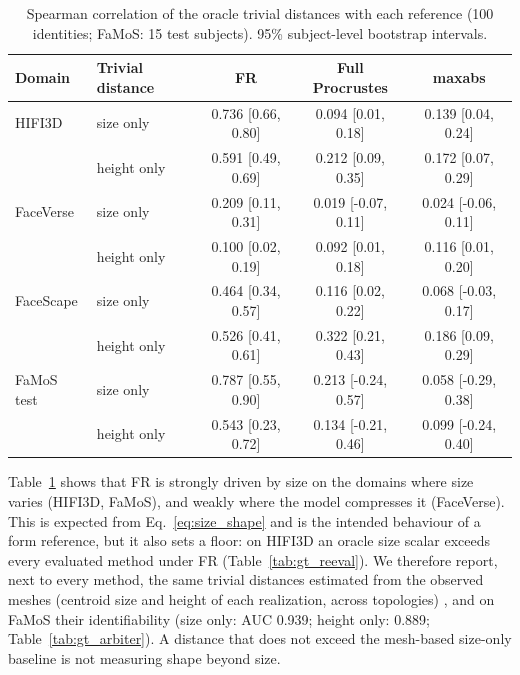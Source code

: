\begin{table}[!ht]
\centering
\small
\caption{Spearman correlation of the oracle trivial distances with each
reference (100 identities; FaMoS: 15 test subjects). 95\% subject-level
bootstrap intervals.}
\label{tab:trivial}
\begin{tabular}{llccc}
\toprule
Domain & Trivial distance & FR & Full Procrustes & maxabs \\
\midrule
HIFI3D     & size only   & 0.736 [0.66, 0.80] & 0.094 [0.01, 0.18]  & 0.139 [0.04, 0.24] \\
           & height only & 0.591 [0.49, 0.69] & 0.212 [0.09, 0.35]  & 0.172 [0.07, 0.29] \\
FaceVerse  & size only   & 0.209 [0.11, 0.31] & 0.019 [-0.07, 0.11] & 0.024 [-0.06, 0.11] \\
           & height only & 0.100 [0.02, 0.19] & 0.092 [0.01, 0.18]  & 0.116 [0.01, 0.20] \\
FaceScape  & size only   & 0.464 [0.34, 0.57] & 0.116 [0.02, 0.22]  & 0.068 [-0.03, 0.17] \\
           & height only & 0.526 [0.41, 0.61] & 0.322 [0.21, 0.43]  & 0.186 [0.09, 0.29] \\
FaMoS test & size only   & 0.787 [0.55, 0.90] & 0.213 [-0.24, 0.57] & 0.058 [-0.29, 0.38] \\
           & height only & 0.543 [0.23, 0.72] & 0.134 [-0.21, 0.46] & 0.099 [-0.24, 0.40] \\
\bottomrule
\end{tabular}
\end{table}

Table~\ref{tab:trivial} shows that FR is strongly driven by size on the
domains where size varies (HIFI3D, FaMoS), and weakly where the model
compresses it (FaceVerse). This is expected from Eq.~\eqref{eq:size_shape}
and is the intended behaviour of a form reference, but it also sets a floor:
on HIFI3D an oracle size scalar exceeds every evaluated method under FR
(Table~\ref{tab:gt_reeval}). We therefore report, next to every method, the
same trivial distances estimated from the observed meshes (centroid size and
height of each realization, across topologies)
,
and on FaMoS their identifiability (size only: AUC 0.939; height only: 0.889;
Table~\ref{tab:gt_arbiter}).
A distance that does not exceed the mesh-based size-only baseline is not
measuring shape beyond size.

